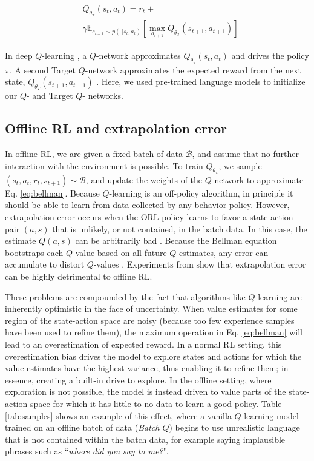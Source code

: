 \begin{align} 
\label{eq:bellman}
\begin{split}
& Q_{\theta_\pi}(s_t,a_t) =  r_t +  \\
    &\gamma \mathbb{E}_{s_{t+1}\sim p(\cdot|s_t,a_t)}[\max_{a_{t+1}} Q_{\theta_T}(s_{t+1},a_{t+1})] 
\end{split}
\end{align}

In deep $Q$-learning \citep{dqn}, a $Q$-network approximates $Q_{\theta_\pi}(s_t,a_t)$ and drives the policy $\pi$. A second Target $Q$-network approximates the expected reward from the next state, $Q_{\theta_T}(s_{t+1},a_{t+1})$ \citep{van2016deep}. Here, we used pre-trained language models to initialize our $Q$- and Target $Q$- networks.

\subsection{Offline RL and extrapolation error} In offline RL, we are given a fixed batch of data $\mathcal{B}$, and assume that no further interaction with the environment is possible. To train $Q_{\theta_{\pi}}$, we sample $(s_t, a_t, r_t, s_{t+1}) \sim \mathcal{B}$, and update the weights of the $Q$-network to approximate Eq. \ref{eq:bellman}. Because $Q$-learning is an off-policy algorithm, in principle it should be able to learn from data collected by any behavior policy. However, extrapolation error occurs when the ORL policy learns to favor a state-action pair $(a,s)$ that is unlikely, or not contained, in the batch data. In this case, the estimate $Q(a,s)$ can be arbitrarily bad \citep{fujimoto2018off}. Because the Bellman equation bootstraps each $Q$-value based on all future $Q$ estimates, any error can accumulate to distort $Q$-values \cite{kumar2019stabilizing}. Experiments from \citet{fujimoto2018off} show that extrapolation error can be highly detrimental to offline RL.

These problems are compounded by the fact that algorithms like $Q$-learning are inherently optimistic in the face of uncertainty. When value estimates for some region of the state-action space are noisy (because too few experience samples have been used to refine them), the maximum operation in Eq. \ref{eq:bellman} will lead to an overestimation of expected reward. In a normal RL setting, this overestimation bias drives the model to explore states and actions for which the value estimates have the highest variance, thus enabling it to refine them; in essence, creating a built-in drive to explore. In the offline setting, where exploration is not possible, the model is instead driven to value parts of the state-action space for which it has little to no data to learn a good policy. Table \ref{tab:samples} shows an example of this effect, where a vanilla $Q$-learning model trained on an offline batch of data (\textit{Batch $Q$}) begins to use unrealistic language that is not contained within the batch data, for example saying implausible phrases such as ``\textit{where did you say to me?}". 

